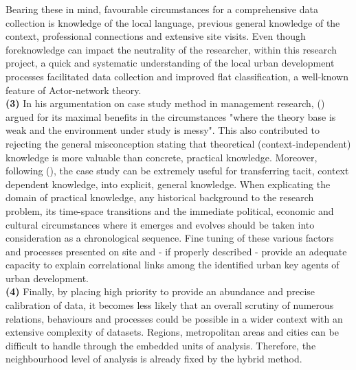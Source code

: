 \documentclass[11pt]{report}
\begin{document}
Bearing these in mind, favourable circumstances for a comprehensive data collection is knowledge of the local language, previous general knowledge of the context, professional connections and extensive site visits. Even though foreknowledge can impact the neutrality of the researcher, within this research project, a quick and systematic understanding of the local urban development processes facilitated data collection and improved flat classification, a well-known feature of Actor-network theory. 
\\

\textbf{(3)} In his argumentation on case study method in management research, (\href{Harrison}{\citealt{partington_case_2002}}) argued for its maximal benefits in the circumstances "where the theory base is weak and the environment under study is messy".
This also contributed to rejecting the general misconception stating that theoretical (context-independent) knowledge is more valuable than concrete, practical knowledge. Moreover, following (\href{Flyvbjerg}{\citealt{flyvbjerg_five_2006}}), the case study can be extremely useful for transferring tacit, context dependent knowledge, into explicit, general knowledge. When explicating the domain of practical knowledge, any historical background to the research problem, its time-space transitions and the immediate political, economic and cultural circumstances where it emerges and evolves should be taken into consideration as a chronological sequence. Fine tuning of these various factors and processes presented on site and - if properly described - provide an adequate capacity to explain correlational links among the identified urban key agents of urban development.
\\

\textbf{(4) }Finally, by placing high priority to provide an abundance and precise calibration of data, it becomes less likely that an overall scrutiny of numerous relations, behaviours and processes could be possible in a wider context with an extensive complexity of datasets. Regions, metropolitan areas and cities can be difficult to handle through the embedded units of analysis. Therefore, the neighbourhood level of analysis is already fixed by the hybrid method.
\\
\end{document}
